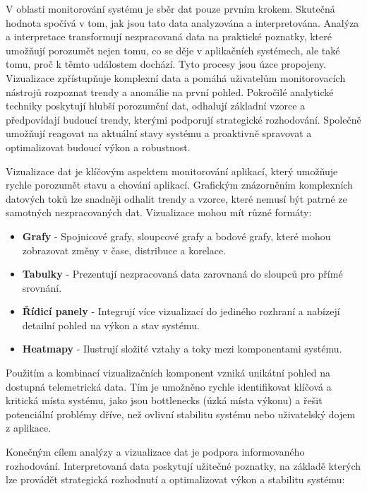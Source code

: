 
V oblasti monitorování systému je sběr dat pouze prvním krokem. Skutečná hodnota spočívá v tom, jak jsou tato data analyzována a interpretována. Analýza a interpretace transformují nezpracovaná data na praktické poznatky, které umožňují porozumět nejen tomu, co se děje v aplikačních systémech, ale také tomu, proč k těmto událostem dochází. Tyto procesy jsou úzce propojeny. Vizualizace zpřístupňuje komplexní data a pomáhá uživatelům monitorovacích nástrojů rozpoznat trendy a anomálie na první pohled. Pokročilé analytické techniky poskytují hlubší porozumění dat, odhalují základní vzorce a předpovídají budoucí trendy, kterými podporují strategické rozhodování. Společně umožňují reagovat na aktuální stavy systému a proaktivně spravovat a optimalizovat budoucí výkon a robustnost. \cite{Majors2022}


Vizualizace dat je klíčovým aspektem monitorování aplikací, který umožňuje rychle porozumět stavu a chování aplikací. Grafickým znázorněním komplexních datových toků lze snadněji odhalit trendy a vzorce, které nemusí být patrné ze samotných nezpracovaných dat. Vizualizace mohou mít různé formáty:

\begin{itemize}
    \item \textbf{Grafy} - Spojnicové grafy, sloupcové grafy a bodové grafy, které mohou zobrazovat změny v čase, distribuce a korelace.
    \item \textbf{Tabulky} - Prezentují nezpracovaná data zarovnaná do sloupců pro přímé srovnání.
    \item \textbf{Řídicí panely} - Integrují více vizualizací do jediného rozhraní a nabízejí detailní pohled na výkon a stav systému.
    \item \textbf{Heatmapy} - Ilustrují složité vztahy a toky mezi komponentami systému.
\end{itemize}

Použitím a kombinací vizualizačních komponent vzniká unikátní pohled na dostupná telemetrická data. Tím je umožněno rychle identifikovat klíčová a kritická místa systému, jako jsou bottlenecks (úzká místa výkonu) a řešit potenciální problémy dříve, než ovlivní stabilitu systému nebo uživatelský dojem z aplikace. \cite{Chapman2023}


Konečným cílem analýzy a vizualizace dat je podpora informovaného rozhodování. Interpretovaná data poskytují užitečné poznatky, na základě kterých lze provádět strategická rozhodnutí a optimalizovat výkon a stabilitu systému:


